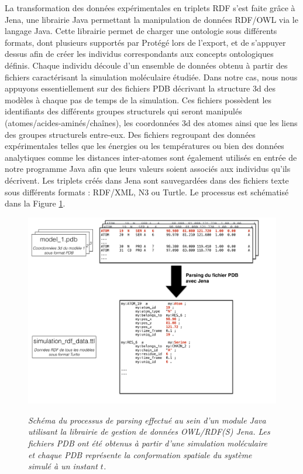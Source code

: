 La transformation des données expérimentales en triplets RDF s'est faite grâce à Jena, une librairie Java permettant la manipulation de données RDF/OWL via le langage Java. Cette librairie permet de charger une ontologie sous différents formats, dont plusieurs supportés par Protégé lors de l'export, et de s'appuyer dessus afin de créer les individus correspondants aux concepts ontologiques définis. Chaque individu découle d'un ensemble de données obtenu à partir des fichiers caractérisant la simulation moléculaire étudiée. Dans notre cas, nous nous appuyons essentiellement sur des fichiers PDB décrivant la structure 3d des modèles à chaque pas de temps de la simulation. Ces fichiers possèdent les identifiants des différents groupes structurels qui seront manipulés (atomes/acides-aminés/chaînes), les coordonnées 3d des atomes ainsi que les liens des groupes structurels entre-eux. Des fichiers regroupant des données expérimentales telles que les énergies ou les températures ou bien des données analytiques comme les distances inter-atomes sont également utilisés en entrée de notre programme Java afin que leurs valeurs soient associés aux individus qu'ils décrivent. Les triplets créés dans Jena sont sauvegardées dans des fichiers texte sous différents formats : RDF/XML, N3 ou Turtle. Le processus est schématisé dans la Figure \ref{Fig:pdb_parsing_to_ttl}.


\begin{figure}
  \centering
  {\includegraphics[width=.75\linewidth]{./figures/ch5/pdb_parsing_to_ttl.pdf}}
    \caption[Processus de traitement de fichiers PDB par Jena, plugin Java.]{{\it Schéma du processus de parsing effectué au sein d'un module Java utilisant la librairie de gestion de données OWL/RDF(S) Jena. Les fichiers PDB ont été obtenus à partir d'une simulation moléculaire et chaque PDB représente la conformation spatiale du système simulé à un instant $t$.}}
  \label{Fig:pdb_parsing_to_ttl}
  \hspace{0.3cm}
\end{figure}

